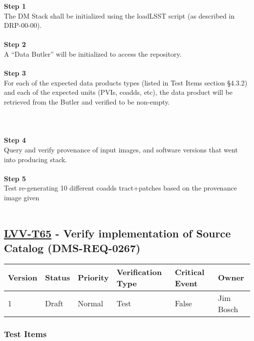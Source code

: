 \textbf{Step 1}\\
The DM Stack shall be initialized using the loadLSST script (as
described in DRP-00-00).\\
~\\
\textbf{Step 2}\\
A ``Data Butler'' will be initialized to access the repository.\\
~\\
\textbf{Step 3}\\
For each of the expected data products types (listed in Test Items
section §4.3.2) and each of the expected units (PVIs, coadds, etc), the
data product will be retrieved from the Butler and verified to be
non-empty.\\
~\\
~\\
~\\
\textbf{Step 4}\\
Query and verify provenance of input images, and software versions that
went into producing stack.\\
~\\
\textbf{Step 5}\\
Test re-generating 10 different coadds tract+patches based on the
provenance image given\\
~\\

\hypertarget{lvv-t65---verify-implementation-of-source-catalog-dms-req-0267}{%
\subsection{\texorpdfstring{\href{https://jira.lsstcorp.org/secure/Tests.jspa\#/testCase/LVV-T65}{LVV-T65}
- Verify implementation of Source Catalog
(DMS-REQ-0267)}{LVV-T65 - Verify implementation of Source Catalog (DMS-REQ-0267)}}\label{lvv-t65---verify-implementation-of-source-catalog-dms-req-0267}}

\begin{longtable}[]{@{}llllll@{}}
\toprule
Version & Status & Priority & Verification Type & Critical Event &
Owner\tabularnewline
\midrule
\endhead
1 & Draft & Normal & Test & False & Jim Bosch\tabularnewline
\bottomrule
\end{longtable}

\hypertarget{test-items-41}{%
\subsubsection{Test Items}\label{test-items-41}}

